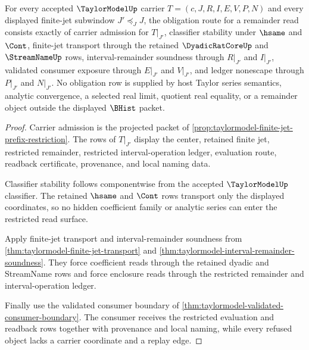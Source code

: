 \begin{theorem}
\label{thm:taylormodel-remainder-obligation-route}
For every accepted $\TaylorModelUp$ carrier $T=(c,J,R,I,E,V,P,N)$ and every displayed finite-jet subwindow $J'\preceq_J J$, the obligation route for a remainder read consists exactly of carrier admission for $T\vert_{J'}$, classifier stability under $\hsame$ and $\Cont$, finite-jet transport through the retained $\DyadicRatCoreUp$ and $\StreamNameUp$ rows, interval-remainder soundness through $R\vert_{J'}$ and $I\vert_{J'}$, validated consumer exposure through $E\vert_{J'}$ and $V\vert_{J'}$, and ledger nonescape through $P\vert_{J'}$ and $N\vert_{J'}$. No obligation row is supplied by host Taylor series semantics, analytic convergence, a selected real limit, quotient real equality, or a remainder object outside the displayed $\BHist$ packet.
\end{theorem}
\begin{proof}
Carrier admission is the projected packet of \autoref{prop:taylormodel-finite-jet-prefix-restriction}. The rows of $T\vert_{J'}$ display the center, retained finite jet, restricted remainder, restricted interval-operation ledger, evaluation route, readback certificate, provenance, and local naming data.

Classifier stability follows componentwise from the accepted $\TaylorModelUp$ classifier. The retained $\hsame$ and $\Cont$ rows transport only the displayed coordinates, so no hidden coefficient family or analytic series can enter the restricted read surface.

Apply finite-jet transport and interval-remainder soundness from \autoref{thm:taylormodel-finite-jet-transport} and \autoref{thm:taylormodel-interval-remainder-soundness}. They force coefficient reads through the retained dyadic and StreamName rows and force enclosure reads through the restricted remainder and interval-operation ledger.

Finally use the validated consumer boundary of \autoref{thm:taylormodel-validated-consumer-boundary}. The consumer receives the restricted evaluation and readback rows together with provenance and local naming, while every refused object lacks a carrier coordinate and a replay edge.
\end{proof}

